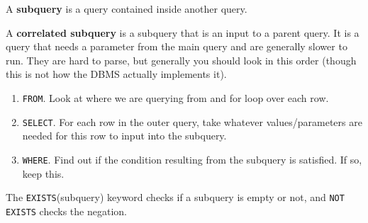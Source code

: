 \documentclass{article}
\begin{document}
      \begin{definition}[Subquery]
        A \textbf{subquery} is a query contained inside another query. 
      \end{definition}

      \begin{definition}
        A \textbf{correlated subquery} is a subquery that is an input to a parent query. It is a query that needs a parameter from the main query and are generally slower to run. They are hard to parse, but generally you should look in this order (though this is not how the DBMS actually implements it). 
        \begin{enumerate}
          \item \texttt{FROM}. Look at where we are querying from and for loop over each row. 
          \item \texttt{SELECT}. For each row in the outer query, take whatever values/parameters are needed for this row to input into the subquery. 
          \item \texttt{WHERE}. Find out if the condition resulting from the subquery is satisfied. If so, keep this. 
        \end{enumerate}
      \end{definition}

      \begin{definition}
        The \texttt{EXISTS}(subquery) keyword checks if a subquery is empty or not, and \texttt{NOT EXISTS} checks the negation. 
      \end{definition}
\end{document}
